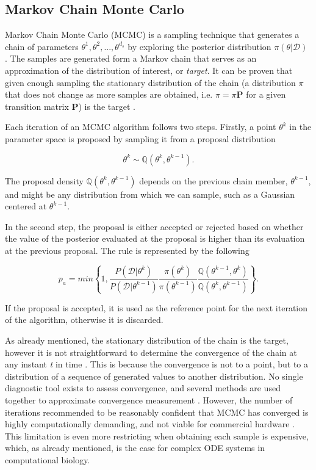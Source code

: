 \documentclass[bsc,frontabs,singlespacing,parskip,deptreport]{infthesis}
\begin{document}
\subsection{Markov Chain Monte Carlo}\label{sec:mcmc_theory}
Markov Chain Monte Carlo (MCMC) is a sampling technique that generates a chain of parameters $\theta^{1}, \theta^{2}, ..., \theta^{d_{s}}$ by exploring the posterior distribution $\pi(\theta | \mathscr{D})$ \cite{P44}. 
The samples are generated form a Markov chain that serves as an approximation of the distribution of interest, or \textit{target}. It can be proven that given enough sampling the stationary distribution of the chain (a distribution $\pi$ that does not change as more samples are obtained, i.e. $\pi = \pi\textbf{P}$ for a given transition matrix $\textbf{P}$) is the target \cite{P45}.

Each iteration of an MCMC algorithm follows two steps. Firstly, a point $\theta^{k}$ in the parameter space is proposed by sampling it from a proposal distribution

\begin{equation}
    \theta^{k} \sim \mathbb{Q}(\theta^{k}, \theta^{k-1}).
\end{equation}



The proposal density $\mathbb{Q}(\theta^{k}, \theta^{k-1})$ depends on the previous chain member, $\theta^{k-1}$, and might be any distribution from which we can sample, such as a Gaussian centered at $\theta^{k-1}$.


In the second step, the proposal is either accepted or rejected based on whether the value of the posterior evaluated at the proposal is higher than its evaluation at the previous proposal. The rule is represented by the following

\begin{equation}
    p_{a} = min\left\{{1, \frac{P(\mathscr{D} | \theta^{k})}{P(\mathscr{D} | \theta^{k-1})} \frac{\pi(\theta^{k})}{\pi(\theta^{k-1})}} \frac{\mathbb{Q}(\theta^{k-1},\theta^{k})}{\mathbb{Q}(\theta^{k},\theta^{k-1})} \right\}.
\end{equation}



If the proposal is accepted, it is used as the reference point for the next iteration of the algorithm, otherwise it is discarded.


As already mentioned, the stationary distribution of the chain is the target, however it is not straightforward to determine the convergence of the chain at any instant \textit{t} in time \cite{oro22547}. This is because the convergence is not to a point, but to a distribution of a sequence of generated values to another distribution. No single diagnostic tool exists to assess convergence, and several methods are used together to approximate convergence measurement \cite{doi:10.1198/1061860031347}. However, the number of iterations recommended to be reasonably confident that MCMC has converged is highly computationally demanding, and not viable for commercial hardware \cite{P37}. This limitation is even more restricting when obtaining each sample is expensive, which, as already mentioned,  is the case for complex ODE systems in computational biology.
\end{document}
